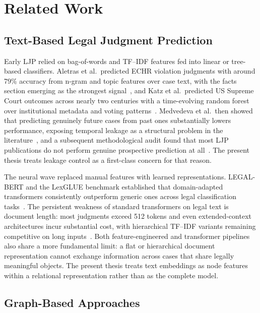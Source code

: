 \chapter{Related Work}

\section{Text-Based Legal Judgment Prediction}

Early LJP relied on bag-of-words and TF--IDF features fed into linear or tree-based classifiers. Aletras et al.\ predicted ECHR violation judgments with around 79\% accuracy from n-gram and topic features over case text, with the facts section emerging as the strongest signal~\cite{aletras2016echr}, and Katz et al.\ predicted US Supreme Court outcomes across nearly two centuries with a time-evolving random forest over institutional metadata and voting patterns~\cite{katz2017supreme}. Medvedeva et al.\ then showed that predicting genuinely future cases from past ones substantially lowers performance, exposing temporal leakage as a structural problem in the literature~\cite{medvedeva2020echr}, and a subsequent methodological audit found that most LJP publications do not perform genuine prospective prediction at all~\cite{medvedeva2023doitright}. The present thesis treats leakage control as a first-class concern for that reason.

The neural wave replaced manual features with learned representations. LEGAL-BERT and the LexGLUE benchmark established that domain-adapted transformers consistently outperform generic ones across legal classification tasks~\cite{chalkidis2020legalbert, chalkidis2022lexglue}. The persistent weakness of standard transformers on legal text is document length: most judgments exceed 512 tokens and even extended-context architectures incur substantial cost, with hierarchical TF--IDF variants remaining competitive on long inputs~\cite{mamakas2022longlegal}. Both feature-engineered and transformer pipelines also share a more fundamental limit: a flat or hierarchical document representation cannot exchange information across cases that share legally meaningful objects. The present thesis treats text embeddings as node features within a relational representation rather than as the complete model.

\section{Graph-Based Approaches}

